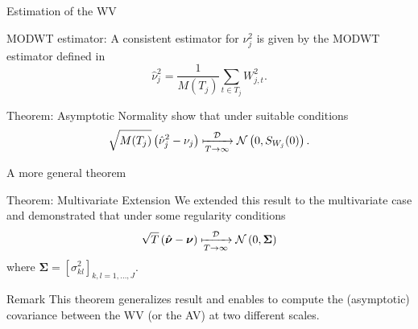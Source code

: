 \documentclass[envcountsect,usenames,dvipsnames]{beamer}
\theoremstyle{mystyle}
\begin{document}
\begin{frame}{Estimation of the WV}
	\begin{block}{MODWT estimator:}
		A consistent estimator for $\nu_j^2$ is given by the MODWT estimator defined in \cite{percival2000wavelet}
		\begin{equation*}
		 \hat{\nu}_j^2 = \frac{1}{M(T_j)} \sum_{t\in T_j} W_{j,t}^2.
		 \label{eq:WaveVar}
		\end{equation*} 
		\end{block}
		\begin{alertblock}{Theorem: Asymptotic Normality}
		    \cite{serroukh2000statistical} show that under suitable conditions
		\begin{eqnarray*}
				\sqrt{M(T_j)}\left(\hat{\nu}_j^2-\nu_j\right) \xmapsto[T\rightarrow\infty]{\mathcal{D}} \mathcal{N}\left(0,S_{W_j}(0)\right).
		\end{eqnarray*}
	\end{alertblock}
\end{frame}


\begin{frame}{A more general theorem}
		\begin{alertblock}{Theorem: Multivariate Extension}
			We extended this result to the multivariate case and demonstrated that under some regularity conditions
			\begin{eqnarray*}
	    	\sqrt{T}\left(\hat{\bm{\nu}}-\bm{\nu}\right) \xmapsto[T\rightarrow\infty]{\mathcal{D}} \mathcal{N}\left(0,\mathbf{\Sigma}\right)
			\end{eqnarray*}
			where
			$\mathbf{\Sigma}=[\sigma^2_{kl}]_{k,l=1,\ldots,J}$.
			\end{alertblock}
			
			\begin{exampleblock}{Remark}
					This theorem generalizes \cite{serroukh2000statistical} result and enables to compute the (asymptotic) covariance between the WV (or the AV) at two different scales.

			  \end{exampleblock}
\end{frame}
\end{document}
